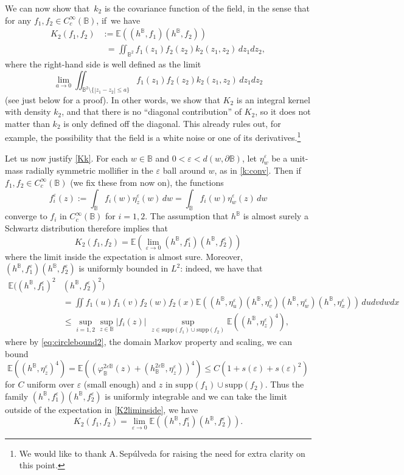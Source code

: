 \documentclass[JEP,XML,SOM,Unicode,published]{cedram}
\let\ts\textstyle
\theoremstyle{definition}
\newcommand{\E}{\mathbb{E}}
\newcommand{\B}{\mathbb{B}}\let\D\B\let\Ub\B
\let\eps\varepsilon
\begin{document}
We can now show that~$k_2$ is the covariance function of the field, in the sense that for any $f_1,f_2 \in C_c^\infty(\B)$, if~we have
\[
\begin{aligned}\label{Kk}K_2(f_1,f_2)& := \mathbb{E}((h^{\D},f_1)(h^\D,f_2)) \\
& \phantom{:}=\iint_{\B^2} f_1(z_1)f_2(z_2)k_2(z_1,z_2) \, dz_1 dz_2,\end{aligned}
\]
where the right-hand side is well defined as the limit
\begin{equation}\label{eq:Kklimit}\lim_{a\to 0}\iint_{\B^2\setminus\{|z_1-z_2|\le a\}} f_1(z_1)f_2(z_2)k_2(z_1,z_2) \, dz_1 dz_2\end{equation}
(see just below for a proof). In other words, we show that $K_2$ is an integral kernel with density $k_2$, and that there is no ``diagonal contribution'' of $K_2$, so it does not matter than $k_2$ is only defined off the diagonal. This already rules out, for example, the possibility that the field is a white noise or one of its derivatives.\footnote{We would like to thank A.\,Sepúlveda for raising the need for extra clarity on this point.}

Let us now justify \eqref{Kk}. For each $w\in \D$ and $0<\eps<d(w,\partial \B)$, let $\eta_{w}^\eps$ be a unit-mass radially symmetric mollifier in the $\eps$ ball around $w$, as in \eqref{k:conv}.
Then if $f_1,f_2\in C_c^\infty(\B)$ (we fix these from now on),
the functions
\[
f_i^\eps(z):= \int_{\B} f_i(w)\eta_{z}^\eps(w) \, dw =\int_{\B} f_i(w) \eta_w^\eps(z) \, dw
\]
converge to $f_i$ in $C_c^\infty(\D)$ for $i=1,2$. The assumption that $h^\D$ is almost surely a Schwartz distribution therefore implies that
\begin{equation}\label{K2liminside}
\ts
K_2(f_1,f_2)=\mathbb{E}(\lim_{\eps\to 0} (h^{
\D},f_1^\eps)(h^{\B},f_2^\eps))\end{equation}
where the limit inside the expectation is almost sure. Moreover, $(h^{\D},f_1^\eps)(h^{\D},f_2^\eps)$ is uniformly bounded in $L^2$: indeed, we have that
\begin{align*}
\mathbb{E}((h^{\D},f_1^\eps)^2&(h^{\D},f_2^\eps)^2)\\
& = \iint f_1(u)f_1(v)f_2(w)f_2(x)\mathbb{E}((h^{\D},\eta_u^\eps)(h^{\D},\eta_v^\eps)(h^\D,\eta_w^\eps)(h^\D,\eta_x^\eps)) \, du dv dw dx \\ & \le \sup_{i=1,2}\sup_{z\in \B} |f_i(z)| \, \, \sup_{z\in \mathrm{supp}(f_1)\cup \mathrm{supp}(f_2)} \mathbb{E}((h^{\B}, \eta_z^\eps)^4),
\end{align*}
where by \eqref{eq:circlebound2}, the domain Markov property and scaling, we can bound
\[
\E((h^\B,\eta_{z}^\eps)^4)=\E((\varphi_\B^{2\eps\B}(z)+(h_\B^{2\eps\B},\eta_z^\eps))^4)\le C(1+s(\eps)+s(\eps)^2)
\]
for $C$ uniform over $\eps$ (small enough) and $z$ in $\mathrm{supp}(f_1)\cup \mathrm{supp}(f_2)$. Thus the family $(h^{\D},f_1^\eps)(h^{\D},f_2^\eps)$ is uniformly integrable and we can take the limit outside of the expectation in \eqref{K2liminside}, \ie we have
\begin{equation}\label{K2limoutside} K_2(f_1,f_2)=\lim_{\eps\to 0} \mathbb{E}((h^{
\D},f_1^\eps)(h^{\B},f_2^\eps)).
\end{equation}
\end{document}
